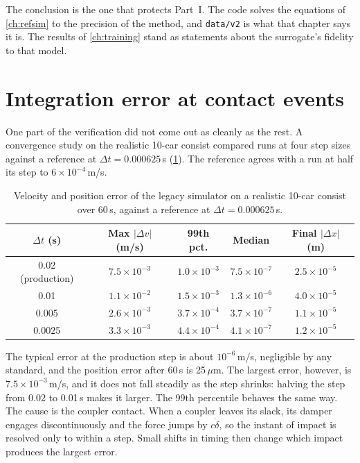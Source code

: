 The conclusion is the one that protects Part~I. The code solves the equations of \cref{ch:refsim} to the precision of the method, and \texttt{data/v2} is what that chapter says it is. The results of \cref{ch:training} stand as statements about the surrogate's fidelity to that model.

\section{Integration error at contact events}
\label{sec:critique_convergence}

One part of the verification did not come out as cleanly as the rest. A convergence study on the realistic 10-car consist compared runs at four step sizes against a reference at $\Delta t = 0.000625$\,s (\cref{tab:critique_convergence}). The reference agrees with a run at half its step to $6\times10^{-4}$\,m/s.

\begin{table}[htbp]
    \centering
    \begin{tabular}{ccccc}
        \toprule
        $\Delta t$ (s) & Max $|\Delta v|$ (m/s) & 99th pct. & Median & Final $|\Delta x|$ (m) \\
        \midrule
        0.02 (production) & $7.5\times10^{-3}$ & $1.0\times10^{-3}$ & $7.5\times10^{-7}$ & $2.5\times10^{-5}$ \\
        0.01   & $1.1\times10^{-2}$ & $1.5\times10^{-3}$ & $1.3\times10^{-6}$ & $4.0\times10^{-5}$ \\
        0.005  & $2.6\times10^{-3}$ & $3.7\times10^{-4}$ & $3.7\times10^{-7}$ & $1.1\times10^{-5}$ \\
        0.0025 & $3.3\times10^{-3}$ & $4.4\times10^{-4}$ & $4.1\times10^{-7}$ & $1.2\times10^{-5}$ \\
        \bottomrule
    \end{tabular}
    \caption{Velocity and position error of the legacy simulator on a realistic 10-car consist over 60\,s, against a reference at $\Delta t = 0.000625$\,s.}
    \label{tab:critique_convergence}
\end{table}

The typical error at the production step is about $10^{-6}$\,m/s, negligible by any standard, and the position error after 60\,s is 25\,$\mu$m. The largest error, however, is $7.5\times10^{-3}$\,m/s, and it does not fall steadily as the step shrinks: halving the step from 0.02 to 0.01\,s makes it larger. The 99th percentile behaves the same way. The cause is the coupler contact. When a coupler leaves its slack, its damper engages discontinuously and the force jumps by $c\dot\delta$, so the instant of impact is resolved only to within a step. Small shifts in timing then change which impact produces the largest error.

